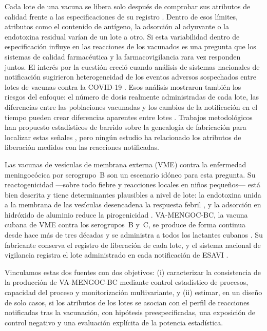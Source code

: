 \documentclass[11pt]{article}
\begin{document}
Cada lote de una vacuna se libera solo después de comprobar sus atributos de calidad frente a las
especificaciones de su registro \cite{WHO2013LotRelease}. Dentro de esos límites, atributos como el
contenido de antígeno, la adsorción al adyuvante o la endotoxina residual varían de un lote a otro.
Si esta variabilidad dentro de especificación influye en las reacciones de los vacunados es una
pregunta que los sistemas de calidad farmacéutica \cite{ICHQ9R1,ICHQ10} y la farmacovigilancia rara
vez responden juntos. El interés por la cuestión creció cuando análisis de sistemas nacionales de
notificación sugirieron heterogeneidad de los eventos adversos sospechados entre lotes de vacunas
contra la COVID-19 \cite{Schmeling2023,Manniche2024,Furst2024,Schmeling2025}. Esos análisis mostraron
también los riesgos del enfoque: el número de dosis realmente administradas de cada lote, las
diferencias entre las poblaciones vacunadas y los cambios de la notificación en el tiempo pueden
crear diferencias aparentes entre lotes \cite{Hviid2023,Scott2023}. Trabajos metodológicos han
propuesto estadísticos de barrido sobre la genealogía de fabricación para localizar estas señales
\cite{Mahaux2019}, pero ningún estudio ha relacionado los atributos de liberación medidos con las
reacciones notificadas.

Las vacunas de vesículas de membrana externa (VME) contra la enfermedad meningocócica por
serogrupo~B son un escenario idóneo para esta pregunta. Su reactogenicidad ---sobre todo fiebre y
reacciones locales en niños pequeños--- está bien descrita \cite{Nokleby2007,Holst2009} y tiene
determinantes plausibles a nivel de lote: la endotoxina unida a la membrana de las vesículas
desencadena la respuesta febril \cite{Sheerin2019,Zariri2016}, y la adsorción en hidróxido de
aluminio reduce la pirogenicidad \cite{Rosenqvist1998}. VA-MENGOC-BC, la vacuna cubana de VME contra
los serogrupos~B y~C, se produce de forma continua desde hace más de tres décadas y se administra a
todos los lactantes cubanos \cite{Sotolongo2007,SierraGonzalez2019}. Su fabricante conserva el
registro de liberación de cada lote, y el sistema nacional de vigilancia registra el lote
administrado en cada notificación de ESAVI \cite{Galindo2012}.

Vinculamos estas dos fuentes con dos objetivos: (i) caracterizar la consistencia de la producción de
VA-MENGOC-BC mediante control estadístico de procesos, capacidad del proceso y monitorización
multivariante, y (ii) estimar, en un diseño de solo casos, si los atributos de los lotes se asocian
con el perfil de reacciones notificadas tras la vacunación, con hipótesis preespecificadas, una
exposición de control negativo y una evaluación explícita de la potencia estadística.
\end{document}
